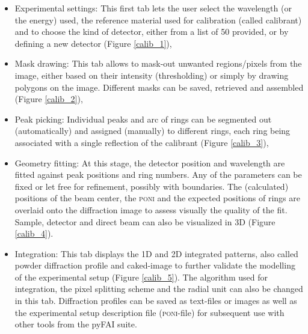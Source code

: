 \documentclass[preprint]{iucr}              %
\begin{document}
\begin{itemize}
  \item{Experimental settings:} This first tab lets the user select
  the wavelength (or the energy) used, the reference material used
  for calibration (called calibrant) and to choose the kind of detector, either from a 
  list of 50 provided, or by defining a new detector (Figure \ref{calib_1}),
  \item{Mask drawing:} This tab allows to mask-out unwanted regions/pixels from the
  image, either based on their intensity (thresholding) or simply by
  drawing polygons on the image. Different masks can be saved, retrieved and assembled (Figure \ref{calib_2}),
  \item{Peak picking:} Individual peaks and arc of rings can be segmented out
  (automatically) and assigned (manually) to different rings, each ring 
  being associated with a single reflection of the calibrant (Figure
  \ref{calib_3}),
  \item{Geometry fitting:} At this stage, the detector position and
  wavelength are fitted against peak positions and ring numbers. 
  Any of the parameters can be fixed or let free for refinement, possibly with boundaries.
  The (calculated) positions of the beam center, the \textsc{poni}
  and the expected positions of rings are overlaid onto the diffraction image
  to assess visually the quality of the fit. Sample, detector 
  and direct beam can also be visualized in 3D (Figure \ref{calib_4}). 
  \item{Integration:} This tab displays the 1D and 2D integrated patterns, also
  called powder diffraction profile and caked-image to further validate the
  modelling of the experimental setup (Figure \ref{calib_5}). 
  The algorithm used for integration, the pixel splitting scheme and the radial unit
  can also be changed in this tab. 
  Diffraction profiles can be saved as text-files or images as well as the
  experimental setup description file (\textsc{poni}-file) for subsequent use with other tools from
  the pyFAI suite.
\end{itemize}
\end{document}
